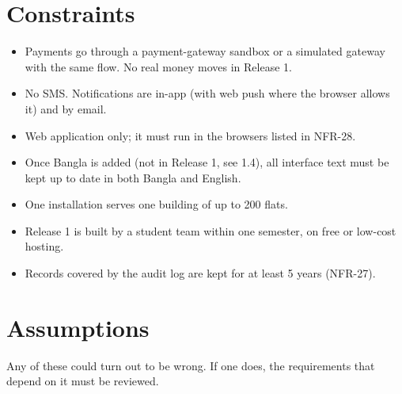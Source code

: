 \documentclass[11pt,a4paper]{report}
\begin{document}
\section{Constraints}

\begin{itemize}
  \item Payments go through a payment-gateway sandbox or a simulated gateway with the same flow. No real money moves in Release 1.
  \item No SMS. Notifications are in-app (with web push where the browser allows it) and by email.
  \item Web application only; it must run in the browsers listed in NFR-28.
  \item Once Bangla is added (not in Release 1, see 1.4), all interface text must be kept up to date in both Bangla and English.
  \item One installation serves one building of up to 200 flats.
  \item Release 1 is built by a student team within one semester, on free or low-cost hosting.
  \item Records covered by the audit log are kept for at least 5 years (NFR-27).
\end{itemize}

\section{Assumptions}

Any of these could turn out to be wrong. If one does, the requirements that depend on it must be reviewed.
\end{document}
